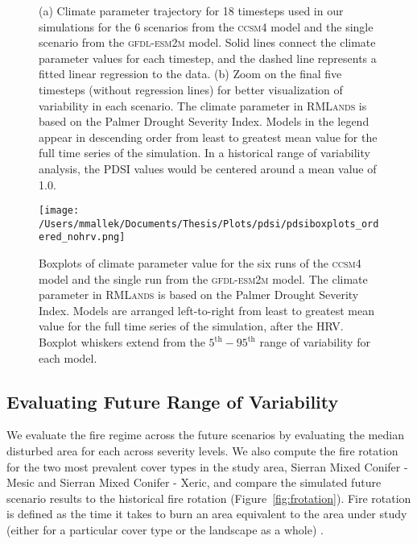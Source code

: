 \begin{figure}[!htbp]
\centering
    \caption{(a) Climate parameter trajectory for 18 timesteps used in our simulations for the 6 scenarios from the \textsc{ccsm4} model and the single scenario from the \textsc{gfdl-esm2m} model. Solid lines connect the climate parameter values for each timestep, and the dashed line represents a fitted linear regression to the data. (b) Zoom on the final five timesteps (without regression lines) for better visualization of variability in each scenario. The climate parameter in \textsc{RMLands} is based on the Palmer Drought Severity Index. Models in the legend appear in descending order from least to greatest mean value for the full time series of the simulation. In a historical range of variability analysis, the PDSI values would be centered around a mean value of 1.0.}
\label{fig:pdsi_future}

\end{figure}

\begin{figure}[!htbp]
\centering
\texttt{[image: /Users/mmallek/Documents/Thesis/Plots/pdsi/pdsiboxplots\_ordered\_nohrv.png]}
\caption{Boxplots of climate parameter value for the six runs of the \textsc{ccsm4} model and the single run from the \textsc{gfdl-esm2m} model. The climate parameter in \textsc{RMLands} is based on the Palmer Drought Severity Index. Models are arranged left-to-right from least to greatest mean value for the full time series of the simulation, after the HRV. Boxplot whiskers extend from the $5^{\text{th}}-95^{\text{th}}$ range of variability for each model.}
\label{pdsi-boxplots}
\end{figure}


\subsection*{Evaluating Future Range of Variability}
We evaluate the fire regime across the future scenarios by evaluating the median disturbed area for each across severity levels. %
We also compute the fire rotation for the two most prevalent cover types in the study area, Sierran Mixed Conifer - Mesic and Sierran Mixed Conifer - Xeric, and compare the simulated future scenario results to the historical fire rotation (Figure~\ref{fig:frotation}). Fire rotation is defined as the time it takes to burn an area equivalent to the area under study (either for a particular cover type or the landscape as a whole) \citep{Agee1993}.%
%



